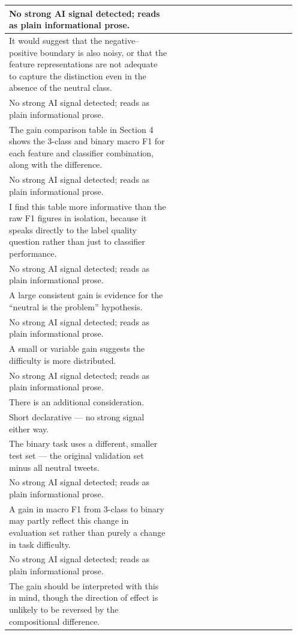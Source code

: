\documentclass[11pt]{article}
\begin{document}
\begin{longtable}{|p{0.55\linewidth}|p{0.40\linewidth}|}
\hline
No strong AI signal detected; reads as plain informational prose. & \\
\hline
It would suggest that the negative--positive boundary is also noisy, or that the feature representations are not adequate to capture the distinction even in the absence of the neutral class. & \\[2pt]
\hline
No strong AI signal detected; reads as plain informational prose. & \\
\hline
The gain comparison table in Section 4 shows the 3-class and binary macro F1 for each feature and classifier combination, along with the difference. & \\[2pt]
\hline
No strong AI signal detected; reads as plain informational prose. & \\
\hline
I find this table more informative than the raw F1 figures in isolation, because it speaks directly to the label quality question rather than just to classifier performance. & \\[2pt]
\hline
No strong AI signal detected; reads as plain informational prose. & \\
\hline
A large consistent gain is evidence for the ``neutral is the problem'' hypothesis. & \\[2pt]
\hline
No strong AI signal detected; reads as plain informational prose. & \\
\hline
A small or variable gain suggests the difficulty is more distributed. & \\[2pt]
\hline
No strong AI signal detected; reads as plain informational prose. & \\
\hline
There is an additional consideration. & \\[2pt]
\hline
Short declarative --- no strong signal either way. & \\
\hline
The binary task uses a different, smaller test set --- the original validation set minus all neutral tweets. & \\[2pt]
\hline
No strong AI signal detected; reads as plain informational prose. & \\
\hline
A gain in macro F1 from 3-class to binary may partly reflect this change in evaluation set rather than purely a change in task difficulty. & \\[2pt]
\hline
No strong AI signal detected; reads as plain informational prose. & \\
\hline
The gain should be interpreted with this in mind, though the direction of effect is unlikely to be reversed by the compositional difference. & \\[2pt]

\end{longtable}
\end{document}
